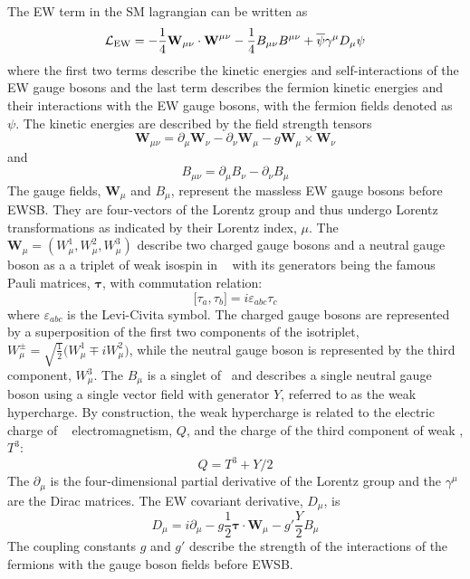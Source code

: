 The EW term in the SM lagrangian can be written as
\begin{equation}
\begin{aligned}
\curlyl_{\textrm{EW}} = -\frac{1}{4}\textbf{W}_{\mu\nu} \cdot \textbf{W}^{\mu\nu} 
- \frac{1}{4} B_{\mu\nu} B^{\mu\nu}  +\overline{\psi}\gamma^{\mu}D_{\mu}\psi
\end{aligned}
\label{eq:lagrangian_ew}
\end{equation}
where the first two terms describe the kinetic energies and 
self-interactions of the EW gauge bosons
and the last term describes the fermion kinetic energies
and their interactions with the EW gauge bosons, 
with the fermion fields denoted as $\psi$.
The kinetic energies are described by the field strength tensors
\begin{equation}
\label{eq:wfieldstrength}
\textbf{W}_{\mu\nu} = \partial_{\mu}\textbf{W}_{\nu} - \partial_{\nu}\textbf{W}_{\mu} - g \textbf{W}_{\mu}\times \textbf{W}_{\nu}
\end{equation}
and 
\begin{equation}
\label{eq:bfieldstrength}
B_{\mu\nu} = \partial_{\mu} B_{\nu} - \partial_{\nu} B_{\mu}
\end{equation}
The gauge fields, $\mathbf{W}_{\mu}$ and $B_{\mu}$, represent the 
massless EW gauge bosons before EWSB.
They are four-vectors of the Lorentz group
and thus undergo Lorentz transformations as indicated by their Lorentz index, $\mu$.
The $\mathbf{W}_{\mu} = (W^1_{\mu},W^2_{\mu},W^3_{\mu})$ 
describe two charged gauge bosons and 
a neutral gauge boson as a
a triplet of weak isospin in \sutwo~
with its generators being the famous Pauli matrices, $\boldsymbol{\tau}$,
with commutation relation:
\begin{equation}
\Big[\tau_a,\tau_b\Big] = i \varepsilon_{abc} \tau_c
\end{equation}
where $\varepsilon_{abc}$ is the Levi-Civita symbol.
The charged gauge bosons are represented by a superposition of the first
two components of the 
isotriplet, $W_{\mu}^{\pm}=\sqrt{\frac{1}{2}}\Big(W_{\mu}^1\mp i W_{\mu}^2\Big)$,
while the neutral gauge boson is represented 
by the third component, $W_{\mu}^3$.
The $B_{\mu}$ is a singlet of \uone~and describes a single neutral gauge boson 
using a single vector field with generator $Y$, referred
to as the weak hypercharge.
By construction, the weak hypercharge is related to
the electric charge of \uone~
electromagnetism, $Q$, 
and the charge of the third component of weak \sutwo, $T^3$:
\begin{equation}
Q=T^3+Y/2
\label{eq:ewcharges}
\end{equation}
The $\partial_{\mu}$ is the four-dimensional partial derivative of the Lorentz
group and the $\gamma^{\mu}$ are the Dirac matrices.
The EW covariant derivative, $D_{\mu}$, is
\begin{equation}
D_{\mu} =  i \partial_{\mu} - g \frac{1}{2} \boldsymbol{\tau} \cdot \textbf{W}_{\mu} - g' \frac{Y}{2} B_{\mu} 
\label{eq:ew_covariant_derivative}
\end{equation}
The coupling constants $g$ and $g'$ describe the strength of the interactions
of the fermions with the gauge boson fields before EWSB. 

